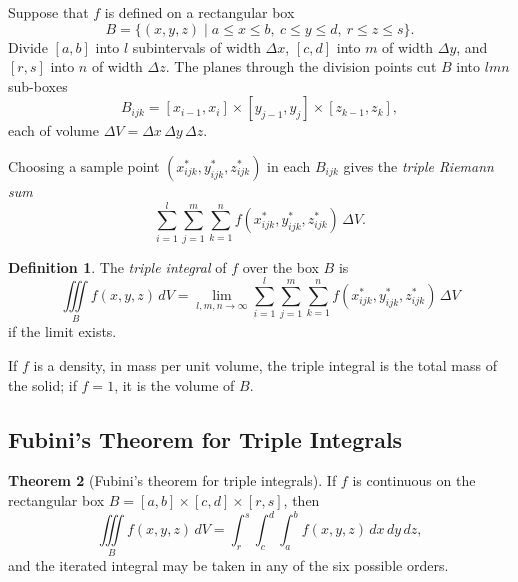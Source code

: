 \documentclass[11pt,a4paper]{article}
\theoremstyle{definition}
\newtheorem{thm}{Theorem}[subsection]
\newtheorem{defn}[thm]{Definition}
\begin{document}
Suppose that $f$ is defined on a rectangular box
\[B = \{(x,y,z) \mid a\leq x \leq b,\ c\leq y \leq d,\ r\leq z \leq s\} .\]
Divide $[a,b]$ into $l$ subintervals of width $\Delta x$, $[c,d]$ into $m$ of
width $\Delta y$, and $[r,s]$ into $n$ of width $\Delta z$. The planes through
the division points cut $B$ into $lmn$ sub-boxes
\[B_{ijk} = [x_{i-1},x_i]\times [y_{j-1},y_j] \times [z_{k-1},z_k],\]
each of volume $\Delta V = \Delta x\,\Delta y\,\Delta z$.

\begin{figure}[H]
\centering
{}
\end{figure}

Choosing a sample point $(x^*_{ijk}, y^*_{ijk},z^*_{ijk})$ in each $B_{ijk}$
gives the \emph{triple Riemann sum}
\[\sum^l_{i=1} \sum^m_{j=1} \sum^n_{k=1} f(x^*_{ijk}, y_{ijk}^*,
z^*_{ijk})\,\Delta V .\]

\begin{defn}
\label{defn:tripleintegral}
The \emph{triple integral} of $f$ over the box $B$ is
\[\iiint\limits_B f(x,y,z)\,dV = \lim_{l,m,n\to \infty} \sum^l_{i=1}
\sum^m_{j=1} \sum^n_{k=1} f(x^*_{ijk}, y_{ijk}^*, z^*_{ijk})\,\Delta V\]
if the limit exists.
\end{defn}

If $f$ is a density, in mass per unit volume, the triple integral is the total
mass of the solid; if $f = 1$, it is the volume of $B$.

{\color[wave]{485}\subsection{Fubini's Theorem for Triple Integrals}}

\begin{thm}[Fubini's theorem for triple integrals]
\label{thm:fubini3}
If $f$ is continuous on the rectangular box $B = [a,b]\times [c,d] \times [r,s]$,
then
\[\iiint\limits_B f(x,y,z)\,dV = \int^s_r\int^d_c\int^b_a f(x,y,z)\,dx \,dy
\,dz ,\]
and the iterated integral may be taken in any of the six possible orders.
\end{thm}
\end{document}
